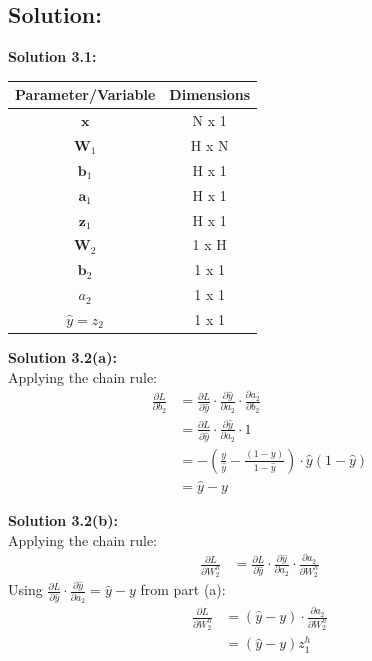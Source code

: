 \documentclass[submit]{harvardml}
\begin{document}
\subsection*{Solution:}
\noindent\textbf{Solution 3.1:}\\
\begin{center}
\begin{tabular}{ |c|c| } 
 \hline
 Parameter/Variable & Dimensions \\ 
 \hline \hline
 $\mathbf{x}$ & N x 1 \\ 
 \hline
 $\mathbf{W}_1$ & H x N \\
 \hline
 $\mathbf{b}_1$ & H x 1 \\ 
 \hline
 $\mathbf{a}_1$ & H x 1 \\ 
 \hline
 $\mathbf{z}_1$ & H x 1 \\ 
 \hline
 $\mathbf{W}_2$ & 1 x H \\
 \hline
 $\mathbf{b}_2$ & 1 x 1 \\
 \hline
 $a_2$ & 1 x 1 \\
 \hline
 $\hat{y} = z_2$ & 1 x 1 \\
 \hline
\end{tabular}
\end{center}

\noindent\textbf{Solution 3.2(a):}\\
Applying the chain rule:
\begin{align*}
    \frac{\partial L}{\partial b_2} &= \frac{\partial L}{\partial \hat{y}} \cdot \frac{\partial \hat{y}}{\partial a_2} \cdot \frac{\partial a_2}{\partial b_2}\\
    &= \frac{\partial L}{\partial \hat{y}} \cdot \frac{\partial \hat{y}}{\partial a_2} \cdot 1\\
    &= - (\frac{y}{\hat{y}}-\frac{(1-y)}{1-\hat{y}}) \cdot \hat{y}(1-\hat{y})\\
    &= \hat{y} - y
\end{align*}

\noindent\textbf{Solution 3.2(b):}\\
Applying the chain rule:
\begin{align*}
    \frac{\partial L}{\partial W_2^h} &= \frac{\partial L}{\partial \hat{y}} \cdot \frac{\partial \hat{y}}{\partial a_2} \cdot \frac{\partial a_2}{\partial W_2^h}
\end{align*}
Using $\frac{\partial L}{\partial \hat{y}} \cdot \frac{\partial \hat{y}}{\partial a_2} = \hat{y} - y$ from part (a):
\begin{align*}
    \frac{\partial L}{\partial W_2^h} &= (\hat{y} - y) \cdot \frac{\partial a_2}{\partial W_2^h}\\
    &= (\hat{y} - y) z_1^h
\end{align*}
\end{document}
